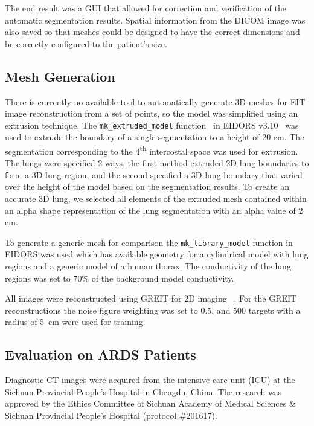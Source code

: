 The end result was a GUI that allowed for correction and verification of the automatic segmentation 
results. Spatial information from the DICOM image was also saved so that meshes could be
designed to have the correct dimensions and be correctly configured to the patient's size.

\subsection{Mesh Generation} \label{sec:mesh-gen}
There is currently no available tool to automatically generate 3D meshes for 
EIT image reconstruction from a set of points, so the model was simplified using an extrusion technique. 
The \verb!mk_extruded_model! 
function~\parencite{grychtol_fem_2013}
in EIDORS v3.10~\parencite{adler_eidors_2017} was used to extrude the boundary 
of a single segmentation to a height of 20 cm.
The segmentation corresponding to the 4\textsuperscript{th} intercostal space was used for extrusion.
The lungs were specified 2 ways, the first method extruded 2D lung boundaries to form a 3D 
lung region, 
and the second specified a 3D lung boundary  that varied over the height of the model based on the segmentation results.  
To create an accurate 3D lung, we selected all elements of the extruded mesh contained within an 
alpha shape representation of the lung segmentation with an alpha value of 2 cm.

To generate a generic mesh for comparison the \verb!mk_library_model! function in 
EIDORS was used which has available geometry for a cylindrical model with lung regions
and a generic model of a human thorax. The conductivity of the lung regions was set to 
70\% of the background model conductivity.

All images were reconstructed using GREIT for 2D
imaging ~\parencite{adler_greit_2009}. For the GREIT 
reconstructions the noise figure weighting was set to 0.5, 
and 500 targets with a radius of 5 cm were used for training.

\subsection{Evaluation on ARDS Patients} \label{sec:gi-scores}

Diagnostic CT images were acquired from the 
intensive care unit (ICU)
at the Sichuan Provincial People's Hospital
in Chengdu, China.
The research was approved
by the Ethics Committee of Sichuan Academy 
of Medical Sciences \& Sichuan Provincial People's Hospital
(protocol \#201617). 

